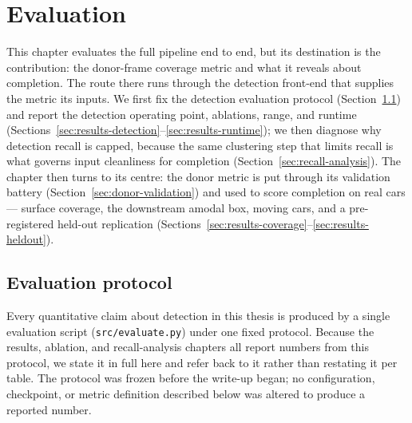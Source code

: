 %
%
\chapter{Evaluation}
\label{ch:evaluation}

This chapter evaluates the full pipeline end to end, but its destination is the
contribution: the donor-frame coverage metric and what it reveals about
completion. The route there runs through the detection front-end that supplies
the metric its inputs. We first fix the detection evaluation protocol
(Section~\ref{sec:eval-protocol}) and report the detection operating point,
ablations, range, and runtime (Sections~\ref{sec:results-detection}--\ref{sec:results-runtime});
we then diagnose why detection recall is capped, because the same clustering
step that limits recall is what governs input cleanliness for completion
(Section~\ref{sec:recall-analysis}). The chapter then turns to its centre: the
donor metric is put through its validation battery
(Section~\ref{sec:donor-validation}) and used to score completion on real cars ---
surface coverage, the downstream amodal box, moving cars, and a pre-registered
held-out replication (Sections~\ref{sec:results-coverage}--\ref{sec:results-heldout}).

\section{Evaluation protocol}
\label{sec:eval-protocol}

Every quantitative claim about detection in this thesis is produced by a single
evaluation script (\texttt{src/evaluate.py}) under one fixed protocol. Because
the results, ablation, and recall-analysis chapters all report numbers from this
protocol, we state it in full here and refer back to it rather than restating it
per table. The protocol was frozen before the write-up began; no configuration,
checkpoint, or metric definition described below was altered to produce a
reported number.

